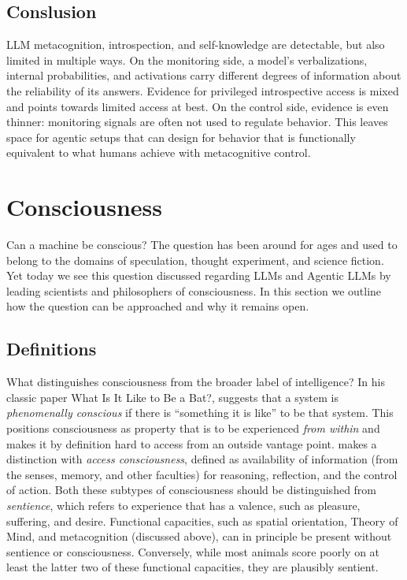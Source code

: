 \subsection{Conslusion}
LLM metacognition, introspection, and self-knowledge are detectable, but also limited in multiple ways. On the monitoring side, a model's verbalizations, internal probabilities, and activations carry different degrees of information about the reliability of its answers. Evidence for privileged introspective access is mixed and points towards limited access at best. On the control side, evidence is even thinner: monitoring signals are often not used to regulate behavior. This leaves space for agentic setups that can design for behavior that is functionally equivalent to what humans achieve with metacognitive control.

\section{Consciousness}\label{sec:consciousness}
Can a machine be conscious? The question has been around for ages and used to belong to the domains of speculation, thought experiment, and science fiction. Yet today we see this question discussed regarding LLMs and Agentic LLMs by leading scientists and philosophers of consciousness. In this section we outline how the question can be approached and why it remains open.

\subsection{Definitions}
What distinguishes consciousness from the broader label of intelligence? In his classic paper What Is It Like to Be a Bat?, \citet{nagel1974bat} suggests that a system is \emph{phenomenally conscious} if there is ``something it is like'' to be that system. This positions consciousness as property that is to be experienced \emph{from within} and makes it by definition hard to access from an outside vantage point. \citet{block1995confusion} makes a distinction with \emph{access consciousness}, defined as availability of information (from the senses, memory, and other faculties) for reasoning, reflection, and the control of action. Both these subtypes of consciousness should be distinguished from \emph{sentience}, which refers to experience that has a valence, such as pleasure, suffering, and desire. Functional capacities, such as spatial orientation, Theory of Mind, and metacognition (discussed above), can in principle be present without sentience or consciousness. Conversely, while most animals score poorly on at least the latter two of these functional capacities, they are plausibly sentient.


